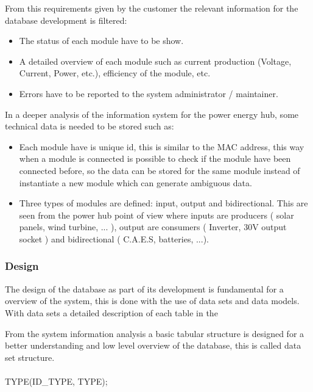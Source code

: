 From this requirements given by the customer the relevant information for the database development is filtered:
	\begin{itemize}
		\item The status of each module have to be show.
		\item A detailed overview of each module such as current production (Voltage, Current, Power, etc.), efficiency of the module, etc.
		\item Errors have to be reported to the system administrator / maintainer.
	\end{itemize}
	
In a deeper analysis of the information system for the power energy hub, some technical data is needed to be stored such as:
	\begin{itemize}
		\item Each module have is unique id, this is similar to the MAC address, this way when a module is connected is possible to check if the module have been connected before, so the data can be stored for the same module instead of instantiate a new module which can generate ambiguous data.
		\item Three types of modules are defined: input, output and bidirectional. This are seen from the power hub point of view where inputs are producers ( solar panels, wind turbine, ... ), output are consumers ( Inverter, 30V output socket ) and bidirectional ( C.A.E.S, batteries, ...).
	\end{itemize}

%	
%	
\subsubsection{Design}
The design of the database as part of its development is fundamental for a overview of the system, this is done with the use of data sets and data models. With data sets a detailed description of each table in the 

From the system information analysis a basic tabular structure is designed for a better understanding and low level overview of the database, this is called data set structure.
\\\\
TYPE(ID\_TYPE, TYPE);

